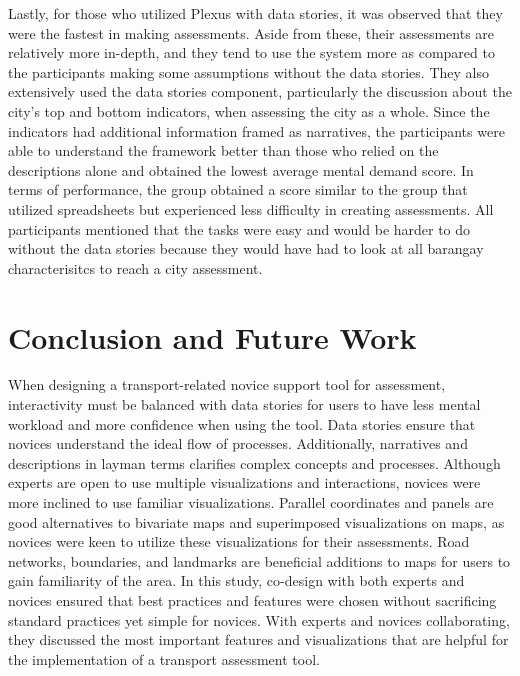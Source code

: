 \documentclass{sigchi}
\begin{document}
Lastly, for those who utilized Plexus with data stories, it was observed that they were the fastest in making assessments. Aside from these, their assessments are relatively more in-depth, and they tend to use the system more as compared to the participants making some assumptions without the data stories. They also extensively used the data stories component, particularly the discussion about the city's top and bottom indicators, when assessing the city as a whole. Since the indicators had additional information framed as narratives, the participants were able to understand the framework better than those who relied on the descriptions alone and obtained the lowest average mental demand score. In terms of performance, the group obtained a score similar to the group that utilized spreadsheets but experienced less difficulty in creating assessments. All participants mentioned that the tasks were easy and would be harder to do without the data stories because they would have had to look at all barangay characterisitcs to reach a city assessment.


\section{Conclusion and Future Work}
When designing a transport-related novice support tool for assessment, interactivity must be balanced with data stories for users to have less mental workload and more confidence when using the tool. Data stories ensure that novices understand the ideal flow of processes. Additionally, narratives and descriptions in layman terms clarifies complex concepts and processes. Although experts are open to use multiple visualizations and interactions, novices were more inclined to use familiar visualizations. Parallel coordinates and panels are good alternatives to bivariate maps and superimposed visualizations on maps, as novices were keen to utilize these visualizations for their assessments. Road networks, boundaries, and landmarks are beneficial additions to maps for users to gain familiarity of the area.  In this study, co-design with both experts and novices ensured that best practices and features were chosen without sacrificing standard practices yet simple for novices. With experts and novices collaborating, they discussed the most important features and visualizations that are helpful for the implementation of a transport assessment tool. 

\end{document}
